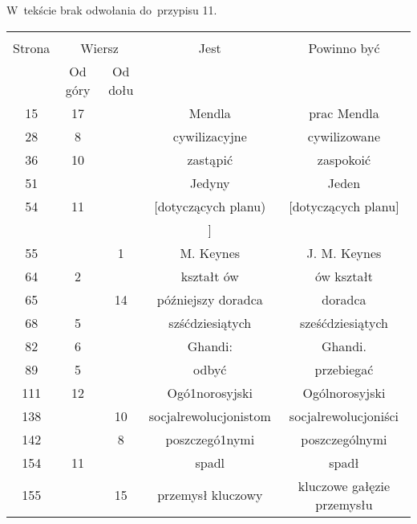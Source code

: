 \documentclass[a4paper,11pt]{article}
\begin{document}
\vspace{\spaceFour}


\start {} W~tekście brak odwołania do~przypisu 11.

\vspace{\spaceFour}


\start {}

\vspace{\spaceFour}


\start {}

\vspace{\spaceFour}


\start {}

\newpage
{}
\begin{center}
  \begin{tabular}{|c|c|c|c|c|}
    \hline
    & \multicolumn{2}{c|}{} & & \\
    Strona & \multicolumn{2}{c|}{Wiersz} & Jest
                              & Powinno być \\ \cline{2-3}
    & Od góry & Od dołu & & \\
    \hline
    15  & 17 & & Mendla & prac Mendla \\
    28  &  8 & & cywilizacyjne & cywilizowane \\
    36  & 10 & & zastąpić & zaspokoić \\
    51  & & & Jedyny & Jeden \\ %
    54  & 11 & & [dotyczących planu) & [dotyczących planu] \\
    & & & ] & \\
    55  & &  1 & M. Keynes & J. M. Keynes \\
    64  &  2 & & kształt ów & ów kształt \\
    65  & & 14 & późniejszy doradca & doradca \\
    68  &  5 & & szśćdziesiątych & sześćdziesiątych \\
    82  &  6 & & Ghandi: & Ghandi. \\
    89  &  5 & & odbyć & przebiegać \\
    111 & 12 & & Ogó1norosyjski & Ogólnorosyjski \\
    138 & & 10 & socjalrewolucjonistom & socjalrewolucjoniści \\
    142 & &  8 & poszczegó1nymi & poszczególnymi \\
    154 & 11 & & spadl & spadł \\
    155 & & 15 & przemysł kluczowy & kluczowe gałęzie przemysłu \\

\end{tabular}
\end{center}
\end{document}
